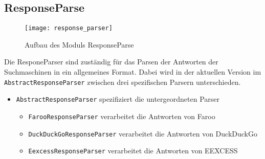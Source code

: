 
\subsection{ResponseParse}

\begin{figure}[htb]
	\centering
		\texttt{[image: response\_parser]}
		\caption{Aufbau des Moduls ResponseParse}
\end{figure}

Die ResponeParser sind zuständig für das Parsen der Antworten der Suchmaschinen in ein allgemeines Format.
Dabei wird in der aktuellen Version im \lstinline|AbstractResponseParser| zwischen drei spezifischen Parsern unterschieden.

\begin{itemize}
	\item \lstinline|AbstractResponseParser| spezifiziert die untergeordneten Parser
	\begin{itemize}
		\item \lstinline|FarooResponseParser| 	verarbeitet die Antworten von Faroo
		\item \lstinline|DuckDuckGoResponseParser| verarbeitet die Antworten von DuckDuckGo
		\item \lstinline|EexcessResponseParser| verarbeitet die Antworten von EEXCESS
	\end{itemize}
\end{itemize}